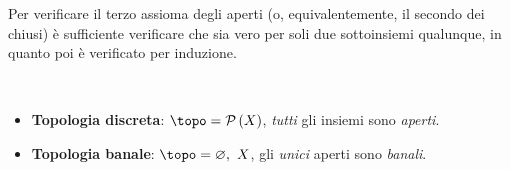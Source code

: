 \begin{observe}
	Per verificare il terzo assioma degli aperti (o, equivalentemente, il secondo dei chiusi) è sufficiente verificare che sia vero per soli due sottoinsiemi qualunque, in quanto poi è verificato per induzione.
\end{observe}

\begin{example}~{}
	\begin{itemize}
		\item \textbf{Topologia discreta}: $\topo=\setpart{X}$, \textit{tutti} gli insiemi sono \textit{aperti}.
		\item \textbf{Topologia banale}: $\topo={\emptyset,\ X}$, gli \textit{unici} aperti sono \textit{banali}.
	\end{itemize}
\end{example}
